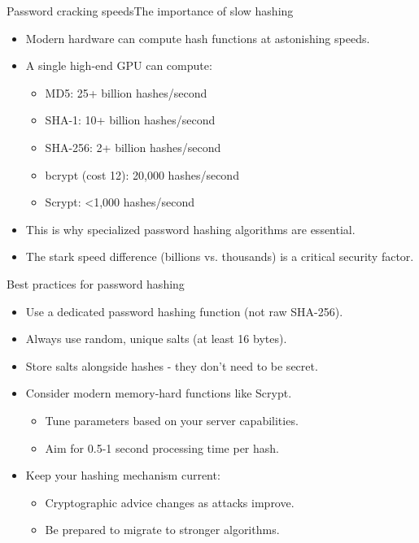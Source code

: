 \documentclass[aspectratio=169, lualatex, handout]{beamer}
\begin{document}
\begin{frame}{Password cracking speeds}{The importance of slow hashing}
	\begin{itemize}[<+->]
		\item Modern hardware can compute hash functions at astonishing speeds.
		\item A single high-end GPU can compute:
		      \begin{itemize}
			      \item MD5: 25+ billion hashes/second
			      \item SHA-1: 10+ billion hashes/second
			      \item SHA-256: 2+ billion hashes/second
			      \item bcrypt (cost 12): 20,000 hashes/second
			      \item Scrypt: <1,000 hashes/second
		      \end{itemize}
		\item This is why specialized password hashing algorithms are essential.
		\item The stark speed difference (billions vs. thousands) is a critical security factor.
	\end{itemize}
\end{frame}

\begin{frame}{Best practices for password hashing}
	\begin{itemize}[<+->]
		\item Use a dedicated password hashing function (not raw SHA-256).
		\item Always use random, unique salts (at least 16 bytes).
		\item Store salts alongside hashes - they don't need to be secret.
		\item Consider modern memory-hard functions like Scrypt.
		      \begin{itemize}
			      \item Tune parameters based on your server capabilities.
			      \item Aim for 0.5-1 second processing time per hash.
		      \end{itemize}
		\item Keep your hashing mechanism current:
		      \begin{itemize}
			      \item Cryptographic advice changes as attacks improve.
			      \item Be prepared to migrate to stronger algorithms.
		      \end{itemize}
	\end{itemize}
\end{frame}
\end{document}
